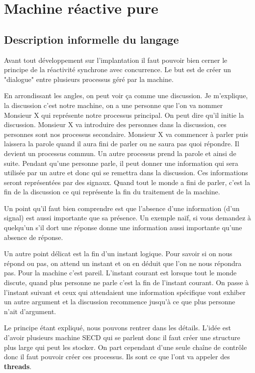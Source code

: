 \documentclass[10pt,a4paper]{report}
\begin{document}
\section{Machine réactive pure}

\subsection{Description informelle du langage}

Avant tout développement sur l'implantation il faut pouvoir bien cerner le principe de la réactivité synchrone avec concurrence. Le but est de créer un "dialogue" entre plusieurs processus géré par la machine. 
\medbreak

En arrondissant les angles, on peut voir ça comme une discussion. Je m'explique, la discussion c'est notre machine, on a une personne que l'on va nommer Monsieur X qui représente notre processus principal. On peut dire qu'il initie la discussion. Monsieur X va introduire des personnes dans la discussion, ces personnes sont nos processus secondaire. Monsieur X va commencer à parler puis laissera la parole quand il aura fini de parler ou ne saura pas quoi répondre. Il devient un processus commun. Un autre processus prend la parole et ainsi de suite. Pendant qu'une personne parle, il peut donner une information qui sera utilisée par un autre et donc qui se remettra dans la discussion. Ces informations seront représentées par des signaux. Quand tout le monde a fini de parler, c'est la fin de la discussion ce qui représente la fin du traitement de la machine.
\medbreak

Un point qu'il faut bien comprendre est que l'absence d'une information (d'un signal) est aussi importante que sa présence. Un exemple naïf, si vous demandez à quelqu'un s'il dort une réponse donne une information aussi importante qu'une absence de réponse.
\medbreak

Un autre point délicat est la fin d'un instant logique. Pour savoir si on nous répond ou pas, on attend un instant et on en déduit que l'on ne nous répondra pas. Pour la machine c'est pareil. L'instant courant est lorsque tout le monde discute, quand plus personne ne parle c'est la fin de l'instant courant. On passe à l'instant suivant et ceux qui attendaient une information spécifique vont exhiber un autre argument et la discussion recommence jusqu'à ce que plus personne n'ait d'argument.
\medbreak

Le principe étant expliqué, nous pouvons rentrer dans les détails. L'idée est d'avoir plusieurs machine SECD qui se parlent donc il faut créer une structure plus large qui peut les stocker. On part cependant d'une seule chaîne de contrôle donc il faut pouvoir créer ces processus. Ils sont ce que l'ont va appeler des \textbf{threads}.
\bigbreak
\end{document}
